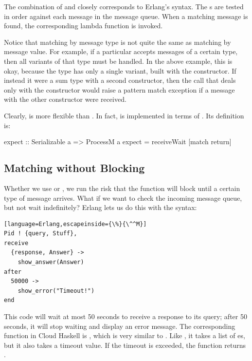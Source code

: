 \documentclass{sigplanconf}
\begin{document}
The combination of  and  closely corresponds to Erlang's  syntax. The s are tested in order against each message in the message queue. When a matching message is found, the corresponding lambda function is invoked. 

Notice that matching by message type is not quite the same as matching by message value. 
For example, if a particular  accepts messages of a certain type, then all variants of that type must be handled. 
In the above example, this is okay, because the  type has only a single variant, built with the  constructor. 
If instead it were a sum type with a second constructor, then the  call that deals only with the  constructor would raise a pattern match exception if a message with the other constructor were received.

Clearly,  is more flexible than . In fact,  is implemented in terms of . Its definition is:

\begin{code}
expect :: Serializable a => ProcessM a
expect = receiveWait [match return]
\end{code}

\subsection{Matching without Blocking}

Whether we use  or , we run the risk that the function will block until a certain type of message arrives. What if we want to check the incoming message queue, but not wait indefinitely? Erlang lets us do this with the  syntax:

\begin{lstlisting}[language=Erlang,escapeinside={\%}{\^^M}]
Pid ! {query, Stuff},
receive
  {response, Answer} ->
    show_answer(Answer)
after
  50000 ->
    show_error("Timeout!")
end
\end{lstlisting}

This code will wait at most 50 seconds to receive a response to its query; after 50 seconds, it will stop waiting and display an error message. 
The corresponding function in Cloud Haskell is , which is very similar to . Like , it takes a list of es, but it also takes a timeout value. If the timeout is exceeded, the function returns .
\end{document}
